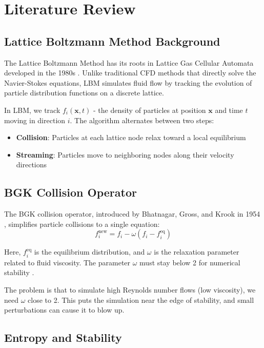 \chapter{Literature Review}

\section{Lattice Boltzmann Method Background}

The Lattice Boltzmann Method has its roots in Lattice Gas Cellular Automata developed in the 1980s \citep{frisch1986}. Unlike traditional CFD methods that directly solve the Navier-Stokes equations, LBM simulates fluid flow by tracking the evolution of particle distribution functions on a discrete lattice.

In LBM, we track $f_i(\mathbf{x}, t)$ - the density of particles at position $\mathbf{x}$ and time $t$ moving in direction $i$. The algorithm alternates between two steps:
\begin{itemize}
    \item \textbf{Collision}: Particles at each lattice node relax toward a local equilibrium
    \item \textbf{Streaming}: Particles move to neighboring nodes along their velocity directions
\end{itemize}

\section{BGK Collision Operator}

The BGK collision operator, introduced by Bhatnagar, Gross, and Krook in 1954 \citep{bhatnagar1954}, simplifies particle collisions to a single equation:
\begin{equation}
f_i^{\mathrm{new}} = f_i - \omega(f_i - f_i^{\mathrm{eq}})
\end{equation}

Here, $f_i^{\mathrm{eq}}$ is the equilibrium distribution, and $\omega$ is the relaxation parameter related to fluid viscosity. The parameter $\omega$ must stay below 2 for numerical stability \citep{sterling1996}.

The problem is that to simulate high Reynolds number flows (low viscosity), we need $\omega$ close to 2. This puts the simulation near the edge of stability, and small perturbations can cause it to blow up.

\section{Entropy and Stability}

